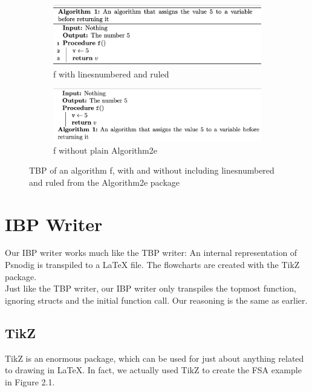 \begin{figure}[ht]
\centering
\begin{subfigure}{.5\textwidth}
  \centering
  \includegraphics[width=.9\linewidth]{assets/return5pretty.png}
  \caption{f with linesnumbered and ruled}
  \label{fig:algoUgly}
\end{subfigure}%
\begin{subfigure}{.5\textwidth}
  \centering
  \includegraphics[width=.9\linewidth]{assets/return5ugly.png}
  \caption{f without plain Algorithm2e}
  \label{fig:algoPretty}
\end{subfigure}
\caption{TBP of an algorithm f, with and without including linesnumbered and ruled from the Algorithm2e package}
\label{fig:algoWithAndWithoutParams}
\end{figure}

\section{IBP Writer}

Our IBP writer works much like the TBP writer: An internal representation of Psnodig is transpiled to a LaTeX file. The flowcharts are created with the TikZ package. \hfill \\

Just like the TBP writer, our IBP writer only transpiles the topmost function, ignoring structs and the initial function call. Our reasoning is the same as earlier.

\subsection{TikZ}

TikZ is an enormous package, which can be used for just about anything related to drawing in LaTeX. In fact, we actually used TikZ to create the FSA example in Figure 2.1. \hfill \\

